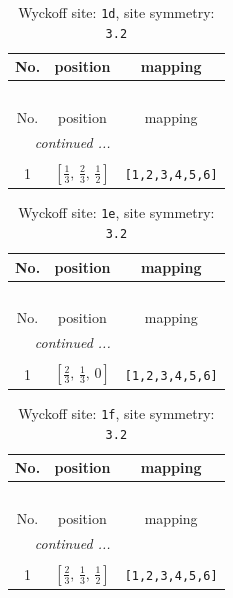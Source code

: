 \documentclass[fleqn,8pt]{jsarticle}
\begin{document}
\renewcommand{\arraystretch}{1.2}
\begin{longtable}{ccc}
\caption{Wyckoff site: {\tt 1d}, site symmetry: {\tt 3.2}}
 \\
 \hline \hline
No. & position & mapping \\ \hline \endfirsthead

\multicolumn{2}{l}{\tablename\ \thetable{}} \\
 \hline \hline
No. & position & mapping \\ \hline \endhead

 \hline \hline
\multicolumn{2}{r}{\footnotesize\it continued ...} \\ \endfoot

 \hline \hline
\multicolumn{2}{r}{} \\ \endlastfoot

1 & $\left[ \frac{1}{3},\, \frac{2}{3},\, \frac{1}{2} \right]$ & {\tt [1,2,3,4,5,6]} \\
\end{longtable}
\renewcommand{\arraystretch}{1.2}
\begin{longtable}{ccc}
\caption{Wyckoff site: {\tt 1e}, site symmetry: {\tt 3.2}}
 \\
 \hline \hline
No. & position & mapping \\ \hline \endfirsthead

\multicolumn{2}{l}{\tablename\ \thetable{}} \\
 \hline \hline
No. & position & mapping \\ \hline \endhead

 \hline \hline
\multicolumn{2}{r}{\footnotesize\it continued ...} \\ \endfoot

 \hline \hline
\multicolumn{2}{r}{} \\ \endlastfoot

1 & $\left[ \frac{2}{3},\, \frac{1}{3},\, 0 \right]$ & {\tt [1,2,3,4,5,6]} \\
\end{longtable}
\renewcommand{\arraystretch}{1.2}
\begin{longtable}{ccc}
\caption{Wyckoff site: {\tt 1f}, site symmetry: {\tt 3.2}}
 \\
 \hline \hline
No. & position & mapping \\ \hline \endfirsthead

\multicolumn{2}{l}{\tablename\ \thetable{}} \\
 \hline \hline
No. & position & mapping \\ \hline \endhead

 \hline \hline
\multicolumn{2}{r}{\footnotesize\it continued ...} \\ \endfoot

 \hline \hline
\multicolumn{2}{r}{} \\ \endlastfoot

1 & $\left[ \frac{2}{3},\, \frac{1}{3},\, \frac{1}{2} \right]$ & {\tt [1,2,3,4,5,6]} \\
\end{longtable}
\end{document}
